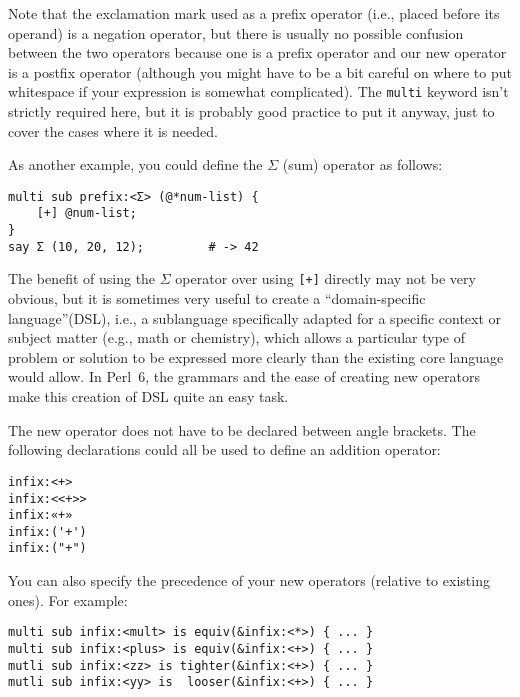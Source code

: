Note that the exclamation mark used as a prefix 
operator (i.e., placed before its operand) is 
a negation operator, but there is usually no possible 
confusion between the two operators because one is a 
prefix operator and our new operator is a postfix operator 
(although you might have to be a bit careful on where 
to put whitespace if your expression is somewhat 
complicated). The {\tt multi} keyword isn't strictly 
required here, but it is probably good practice to 
put it anyway, just to cover the cases where it is 
needed. 

As another example, you could define the $\Sigma$ (sum) 
operator as follows:

\begin{verbatim}
multi sub prefix:<Σ> (@*num-list) {
    [+] @num-list;
}
say Σ (10, 20, 12);         # -> 42
\end{verbatim}

The benefit of using the $\Sigma$ operator over using 
\verb'[+]' directly may not be very obvious, but it is 
sometimes very useful to create a ``domain-specific 
language''(DSL), i.e., a sublanguage specifically 
adapted for a specific context or subject matter (e.g., math 
or chemistry), which allows a particular type of problem 
or solution to be expressed more clearly than the 
existing core language would allow. In Perl~6, the 
grammars and the ease of creating new operators make 
this creation of DSL quite an easy task.


The new operator does not have to be declared between 
angle brackets. The following declarations could 
all be used to define an addition operator:

\begin{verbatim}
infix:<+>
infix:<<+>>
infix:«+»
infix:('+')
infix:("+")
\end{verbatim}

You can also specify the precedence of your new 
operators (relative to existing ones). For example:

\begin{verbatim}
multi sub infix:<mult> is equiv(&infix:<*>) { ... }
multi sub infix:<plus> is equiv(&infix:<+>) { ... }
mutli sub infix:<zz> is tighter(&infix:<+>) { ... }
mutli sub infix:<yy> is  looser(&infix:<+>) { ... }
\end{verbatim}

